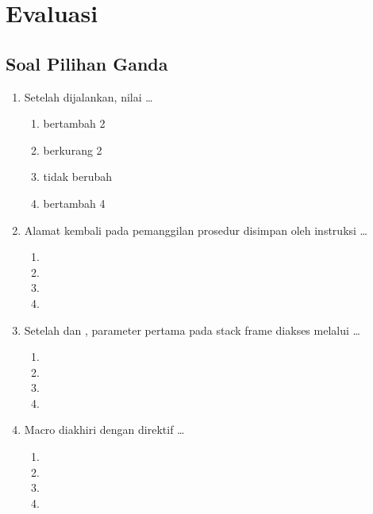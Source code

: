 \section{Evaluasi}
\label{sec:evaluasi-bab14}

\subsection{Soal Pilihan Ganda}

\begin{enumerate}
    \item Setelah  dijalankan, nilai  \dots
          \begin{enumerate}
              \item bertambah 2
              \item berkurang 2
              \item tidak berubah
              \item bertambah 4
          \end{enumerate}

    \item Alamat kembali pada pemanggilan prosedur disimpan oleh
          instruksi \dots
          \begin{enumerate}
              \item {} \item {}
              \item {} \item {}
          \end{enumerate}

    \item Setelah  dan , parameter
          pertama pada stack frame diakses melalui \dots
          \begin{enumerate}
              \item \code{[BP+0]} \item \code{[BP+2]}
              \item \code{[BP+4]} \item \code{[BP+6]}
          \end{enumerate}

    \item Macro diakhiri dengan direktif \dots
          \begin{enumerate}
              \item {} \item {}
              \item {} \item {}
          \end{enumerate}


\end{enumerate}
